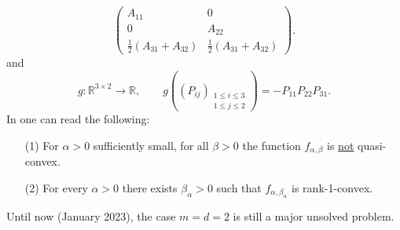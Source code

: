 \begin{example}
\begin{itemize}
\[\begin{pmatrix}
		A_{11}&0\\
		0&A_{22}\\
		\frac{1}{2}(A_{31}+A_{32})&\frac{1}{2}(A_{31}+A_{32})
	\end{pmatrix}.\]
	and
	\[g:\mathbb{R}^{3\times 2}\longrightarrow\mathbb{R},\qquad g\left((P_{ij})_{\substack{1\leq i\leq 3\\1\leq j\leq 2}}\right)=-P_{11}P_{22}P_{31}.\]
	In \cite[Part I, Chapter 7, 7.3 Generalized Convexity Notions and Envelopes, Example 7.10]{Rind2018CV} one can read the following:
	\begin{itemize}
		\item[(1)] For $\alpha>0$ sufficiently small, for all $\beta>0$ the function $f_{\alpha,\beta}$ is \underline{not} quasi-convex.
		\item[(2)] For every $\alpha>0$ there exists $\beta_\alpha>0$ such that $f_{\alpha,\beta_\alpha}$ is rank-1-convex.\\
	\end{itemize}

	Until now (January 2023), the case $m=d=2$ is still a major unsolved problem.
\end{itemize}
\end{example}